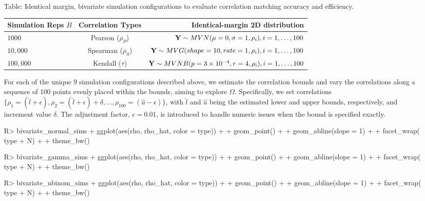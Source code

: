 \documentclass[
]{jss}
\begin{document}
Table: \label{tab:sims} Identical margin, bivariate simulation configurations to evaluate correlation matching accuracy and efficiency.

\begin{table}[]
\begin{tabular}{@{}lcr@{}}
\toprule
Simulation Reps $B$ & Correlation Types & Identical-margin 2D distribution \\ \midrule
$1000$ & Pearson ($\rho_P$) & ${\bf Y} \sim MVN( \mu= 0 , \sigma = 1, \rho_i ), i=1,\ldots,100$ \\
$10,000$ & Spearman ($\rho_S$) & ${\bf Y} \sim MVG( shape = 10, rate = 1, \rho_i ), i=1,\ldots,100$ \\
$100,000$ & Kendall ($\tau$) & ${\bf Y} \sim MVNB(p = 3\times10^{-4}, r = 4,\rho_i), i=1,\ldots,100$ \\ \bottomrule
\end{tabular}
\end{table}

For each of the unique 9 simulation configurations described above, we estimate the correlation bounds and vary the correlations along a sequence of 100 points evenly placed within the bounds, aiming to explore \(\Omega\). Specifically, we set correlations \(\{ \rho_1 = ( \hat{l} + \epsilon), \rho_2 = (\hat{l} + \epsilon) + \delta, \ldots, \rho_{100} = (\hat{u} - \epsilon) \}\), with \(\hat{l}\) and \(\hat{u}\) being the estimated lower and upper bounds, respectively, and increment value \(\delta\). The adjustment factor, \(\epsilon=0.01\), is introduced to handle numeric issues when the bound is specified exactly.

\begin{CodeChunk}
\begin{CodeInput}
R> bivariate_normal_sims %
+     ggplot(aes(rho, rho_hat, color = type)) +
+     geom_point() +
+     geom_abline(slope = 1) +
+     facet_wrap(~ type + N) + 
+     theme_bw()
\end{CodeInput}
\end{CodeChunk}

\begin{CodeChunk}
\begin{CodeInput}
R> bivariate_gamma_sims %
+     ggplot(aes(rho, rho_hat, color = type)) +
+     geom_point() +
+     geom_abline(slope = 1) +
+     facet_wrap(~ type + N) + 
+     theme_bw()
\end{CodeInput}
\end{CodeChunk}

\begin{CodeChunk}
\begin{CodeInput}
R> bivariate_nbinom_sims %
+     ggplot(aes(rho, rho_hat, color = type)) +
+     geom_point() +
+     geom_abline(slope = 1) +
+     facet_wrap(~ type + N) + 
+     theme_bw()
\end{CodeInput}
\end{CodeChunk}
\end{document}
